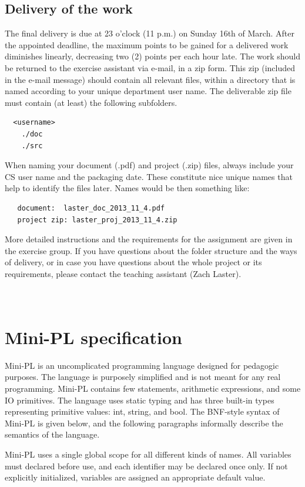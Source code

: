 \documentclass[english,11pt,twoside,a4paper]{article}
\begin{document}
\subsection{Delivery of the work}

The final delivery is due at 23 o'clock (11 p.m.) on Sunday 16th of March. After the appointed deadline, the maximum points to be gained for a delivered work diminishes linearly, decreasing two (2) points per each hour late.
The work should be returned to the exercise assistant via e-mail, in a zip form. This zip (included in the e-mail message) should contain all relevant files, within a directory that is named according to your unique department user name. The deliverable zip file must contain (at least) the following subfolders.
\begin{lstlisting}
  <username>
    ./doc
    ./src 
\end{lstlisting}
When naming your document (.pdf) and project (.zip) files, always include your CS user name and the packaging date. These constitute nice unique names that help to identify the files later. Names would be then something like: 
\begin{lstlisting}
   document:  laster_doc_2013_11_4.pdf 
   project zip: laster_proj_2013_11_4.zip
\end{lstlisting}
More detailed instructions and the requirements for the assignment are given in the exercise group. If you have questions about the folder structure and the ways of delivery, or in case you have questions about the whole project or its requirements, please contact the teaching assistant (Zach Laster).

\newpage
\section{\\Mini-PL specification} \label{App:MiniPLSpec}

Mini-PL is an uncomplicated programming language designed for pedagogic purposes. The language is purposely simplified and is not meant for any real programming. Mini-PL contains few statements, arithmetic expressions, and some IO primitives. The language uses static typing and has three built-in types representing primitive values: int, string, and bool. The BNF-style syntax of Mini-PL is given below, and the following paragraphs informally describe the semantics of the language. 
 
Mini-PL uses a single global scope for all different kinds of names. All variables must declared before use, and each identifier may be declared once only. If not explicitly initialized, variables are assigned an appropriate default value. 
 
\end{document}
